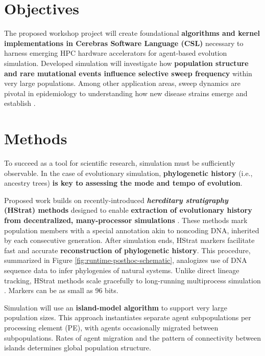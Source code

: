\section{Objectives}

The proposed workshop project will create foundational \textbf{algorithms and kernel implementations in Cerebras Software Language (CSL)} necessary to harness emerging HPC hardware accelerators for agent-based evolution simulation.
Developed simulation will investigate how \textbf{population structure and rare mutational events influence selective sweep frequency} within very large populations.
Among other application areas, sweep dynamics are pivotal in epidemiology to understanding how new disease strains emerge and establish \cite{markov2023evolution}.

\section{Methods}

To succeed as a tool for scientific research, simulation must be sufficiently observable.
In the case of evolutionary simulation, \textbf{phylogenetic history} (i.e., ancestry trees) \textbf{is key to assessing the mode and tempo of evolution}.



Proposed work builds on recently-introduced \textbf{\textit{hereditary stratigraphy} (HStrat) methods} designed to enable \textbf{extraction of evolutionary history from decentralized, many-processor simulations} \cite{moreno2022hstrat}.
These methods mark population members with a special annotation akin to noncoding DNA, inherited by each consecutive generation.
After simulation ends, HStrat markers facilitate fast and accurate \textbf{reconstruction of phylogenetic history}.
This procedure, summarized in Figure \ref{fig:runtime-posthoc-schematic}, analogizes use of DNA sequence data to infer phylogenies of natural systems.
Unlike direct lineage tracking, HStrat methods scale gracefully to long-running multiprocess simulation \cite{moreno2024analysis}.
Markers can be as small as 96 bits.

Simulation will use an \textbf{island-model algorithm} to support very large population sizes.
This approach instantiates separate agent subpopulations per processing element (PE), with agents occasionally migrated between subpopulations.
Rates of agent migration and the pattern of connectivity between islands determines global population structure.

